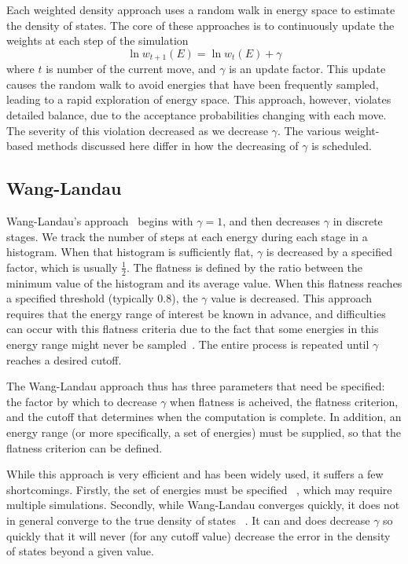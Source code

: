 \documentclass[letterpaper,twocolumn,amsmath,amssymb,pre,aps,10pt]{revtex4-1}
\begin{document}
Each weighted density approach uses a random walk in energy space to
estimate the density of states.  The core of these approaches
is to continuously update the weights at each step of the simulation
\begin{equation}
	\ln{w_{t+1}(E)}=\ln{w_{t}(E)}
	+\gamma
\end{equation}
where $t$ is number of the current move, and $\gamma$ is an update
factor.  This update causes the random walk to avoid energies that
have been frequently sampled, leading to a rapid exploration of energy
space.  This approach, however, violates detailed balance, due to the
acceptance probabilities changing with each move.  The severity of
this violation decreased as we decrease $\gamma$.  The various
weight-based methods discussed here differ in how the decreasing of $\gamma$
is scheduled.

\subsection{Wang-Landau}

Wang-Landau's approach~\cite{wang2001efficient,wang2001determining,
  landau2014guide} begins with $\gamma=1$, and then decreases $\gamma$
in discrete stages.  We track the number of steps at each energy during
each stage in a histogram.  When that histogram is sufficiently flat,
$\gamma$ is decreased by a specified factor, which is usually
$\frac12$.  The flatness is defined by the ratio between the minimum
value of the histogram and its average value.  When this flatness
reaches a specified threshold (typically 0.8), the $\gamma$ value is
decreased.  This approach requires that the energy range of interest
be known in advance, and difficulties can occur with this flatness
criteria due to the fact that some energies in this energy range might
never be sampled~\cite{haber2014transition}.  The entire process is
repeated until $\gamma$ reaches a desired cutoff.

The Wang-Landau approach thus has three parameters that need be
specified: the factor by which to decrease $\gamma$ when flatness is
acheived, the flatness criterion, and the cutoff that determines when
the computation is complete.  In addition, an energy range (or more
specifically, a set of energies) must be supplied, so that the
flatness criterion can be defined.

While this approach
is very efficient and has been widely used, it suffers a few
shortcomings.  Firstly, the set of energies must be specified
~\cite{wang2001efficient, schulz2003avoiding, yan2003fast}, which may
require multiple simulations. Secondly, while Wang-Landau converges quickly,
it does not in general converge to the true density of states
~\cite{belardinelli2008analysis, zhou2008optimal}.  It can and does decrease
$\gamma$ so quickly that it will never (for any cutoff value) decrease the
error in the density of states beyond a given value.
\end{document}
